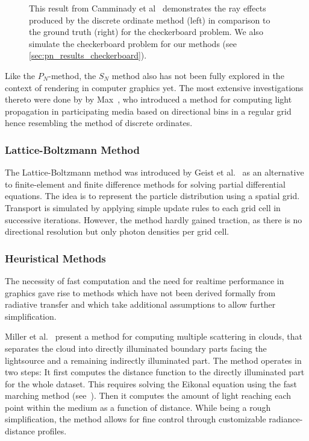 \begin{figure}[h]
\begin{subfigure}{0.4\columnwidth}
\end{subfigure}%
\caption{This result from Camminady et al~\cite{Camminady2019} demonstrates the ray effects produced by the discrete ordinate method (left) in comparison to the ground truth (right) for the checkerboard problem. We also simulate the checkerboard problem for our methods (see \ref{sec:pn_results_checkerboard}).}
\end{figure}

Like the $P_N$-method, the $S_N$ method also has not been fully explored in the context of rendering in computer graphics yet. The most extensive investigations thereto were done by by Max~\cite{Max95}, who introduced a method for computing light propagation in participating media based on directional bins in a regular grid hence resembling the method of discrete ordinates.


\subsubsection*{Lattice-Boltzmann Method}

The Lattice-Boltzmann method was introduced by Geist et al.~\cite{Geist04} as an alternative to finite-element and finite difference methods for solving partial differential equations. The idea is to represent the particle distribution using a spatial grid. Transport is simulated by applying simple update rules to each grid cell in successive iterations. However, the method hardly gained traction, as there is no directional resolution but only photon densities per grid cell.

\subsubsection*{Heuristical Methods}

The necessity of fast computation and the need for realtime performance in graphics gave rise to methods which have not been derived formally from radiative transfer and which take additional assumptions to allow further simplification.

Miller et al.~\cite{Miller12} present a method for computing multiple scattering in clouds, that separates the cloud into directly illuminated boundary parts facing the lightsource and a remaining indirectly illuminated part. The method operates in two steps: It first computes the distance function to the directly illuminated part for the whole dataset. This requires solving the Eikonal equation using the fast marching method (see~\cite{Tsitsiklis95}). Then it computes the amount of light reaching each point within the medium as a function of distance. While being a rough simplification, the method allows for fine control through customizable radiance-distance profiles.

